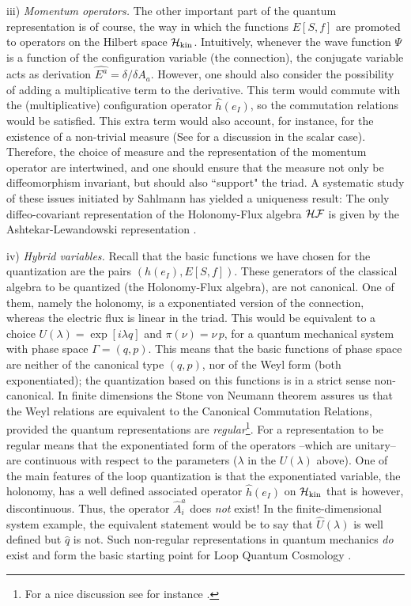 \documentclass[aps,prd,tightenlines,showpacs,nofootinbib,preprint]{revtex4}
\def\G{{\Gamma}}  \def\h{\hat} \def\H{{\cal H}} \def\O{{\cal O}}
\begin{document}
 iii) {\it Momentum
operators.} The other important part of the quantum representation
is of course, the way in which the functions $E[S,f]$ are promoted
to operators on the Hilbert space $\H_{\rm kin}$. Intuitively,
whenever the wave function $\Psi$ is a function of the
configuration variable (the connection), the conjugate variable
acts as derivation $\hat{E^a}=\delta/\delta A_a$. However, one
should also consider the possibility of adding a multiplicative
term to the derivative. This term would commute with the
(multiplicative) configuration operator $\hat{h}(e_I)$, so the
commutation relations would be satisfied. This extra term  would
also account, for instance, for the existence of a non-trivial
measure (See \cite{CCQ} for a discussion in the scalar case).
Therefore, the choice of measure and the representation of the
momentum operator are intertwined, and one should ensure that the
measure not only be diffeomorphism invariant, but should also
``support" the triad. A systematic study of these issues initiated
by Sahlmann has yielded a uniqueness result: The only
diffeo-covariant representation of the Holonomy-Flux algebra
${\cal HF}$ is given by the Ashtekar-Lewandowski representation
\cite{LOST}.

iv) {\it Hybrid variables.} Recall that the basic functions we
have chosen for the quantization are the pairs $(h(e_I),E[S,f])$.
These generators of the classical algebra to be quantized (the
Holonomy-Flux algebra), are not canonical. One of them, namely the
holonomy, is a exponentiated version of the connection, whereas
the electric flux is linear in the triad. This would be equivalent
to a choice $U(\lambda)=\exp[i\lambda q]$ and $\pi(\nu)=\nu\,p$,
for a quantum mechanical system with phase space $\G=(q,p)$. This
means that the basic functions of phase space are neither of the
canonical type $(q,p)$, nor of the Weyl form (both exponentiated);
the quantization based on this functions is in a strict sense
non-canonical. In finite dimensions the Stone von Neumann theorem
assures us that the Weyl relations are equivalent to the Canonical
Commutation Relations, provided the quantum representations are
{\it regular}\footnote{For a nice discussion see for instance
\cite{wald2}.}. For a representation to be regular means that the
exponentiated form of the operators --which are unitary-- are
continuous with respect to the parameters ($\lambda$ in the
$U(\lambda)$ above). One of the main features of the loop
quantization is that the exponentiated variable, the holonomy, has
a well defined associated operator $\hat{h}(e_I)$ on $\H_{\rm
kin}$ that is however, discontinuous. Thus, the operator
$\hat{A}_i^a$ does {\it not} exist! In the finite-dimensional
system example, the equivalent statement would be to say that
$\hat{U}(\lambda)$ is well defined but $\hat{q}$ is not. Such
non-regular representations in quantum mechanics {\it do} exist
\cite{poly} and form the basic starting point for Loop Quantum
Cosmology \cite{LQC,bojo}.
\end{document}
